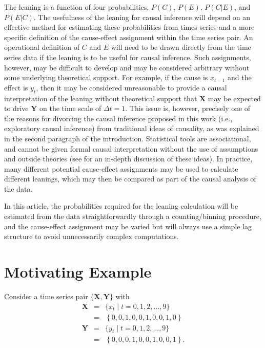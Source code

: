 \documentclass[twocolumn,aps,pre,groupedaddress]{revtex4-1}
\begin{document}
The leaning is a function of four probabilities, $P(C)$, $P(E)$, $P(C|E)$, and $P(E|C)$.  The usefulness of the leaning for causal inference will depend on an effective method for estimating these probabilities from times series and a more specific definition of the cause-effect assignment within the time series pair.  An operational definition of $C$ and $E$ will need to be drawn directly from the time series data if the leaning is to be useful for causal inference.  Such assignments, however, may be difficult to develop and may be considered arbitrary without some underlying theoretical support.  For example, if the cause is $x_{t-1}$ and the effect is $y_{t}$, then it may be considered unreasonable to provide a causal interpretation of the leaning without theoretical support that $\mathbf{X}$ may be expected to drive $\mathbf{Y}$ on the time scale of $\Delta t=1$.  This issue is, however, precisely one of the reasons for divorcing the causal inference proposed in this work (i.e., exploratory causal inference) from traditional ideas of causality, as was explained in the second paragraph of the introduction.  Statistical tools are associational, and cannot be given formal causal interpretation without the use of assumptions and outside theories (see \cite{Illari2014} for an in-depth discussion of these ideas).  In practice, many different potential cause-effect assignments may be used to calculate different leanings, which may then be compared as part of the causal analysis of the data.

In this article, the probabilities required for the leaning calculation will be estimated from the data straightforwardly through a counting/binning procedure, and the cause-effect assignment may be varied but will always use a simple lag structure to avoid unnecessarily complex computations.

\section{Motivating Example}
Consider a time series pair $\{\mathbf{X},\mathbf{Y}\}$ with
\begin{eqnarray*}
\label{eq:motex}
\mathbf{X} &=& \{x_t\; | \; t=0,1,2,\ldots,9 \}\\
&=& \left\{0,0,1,0,0,1,0,0,1,0\right\}\\
\mathbf{Y} &=& \{y_t\; | \; t=0,1,2,\ldots,9\}\\
&=& \left\{0,0,0,1,0,0,1,0,0,1\right\}.
\end{eqnarray*}
\end{document}
